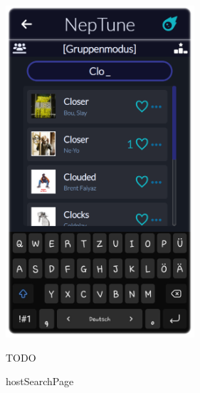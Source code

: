 \documentclass[oneside, ngerman]{sdqtechreport}
\begin{document}
\begin{figure}
    \hypertarget{hostSearchPage}{}
    \begin{minipage}[t]{7 cm}
        \vspace{-1.5ex}
        \includegraphics[width=7cm]{LATEX/Pflichtenheft/GraphicDesigns/hostSearchPage.png}
        \caption{hostSearchPage}
    \end{minipage}
    \hspace{1cm}
    \begin{minipage}[t]{7 cm}
        \vspace{1cm}
        TODO
    \end{minipage}
\end{figure}
\end{document}
